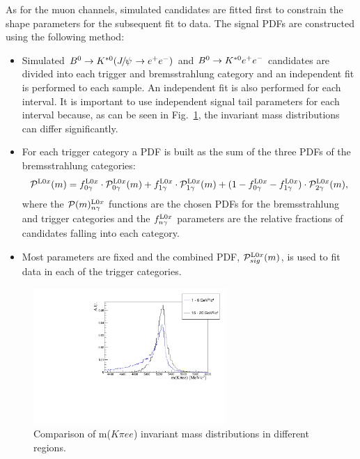 As for the muon channels, simulated candidates are fitted first to constrain
the shape parameters for the subsequent fit to data. The signal PDFs are constructed using the following method:
%
\begin{itemize}
\item Simulated $\Bz\to\Kstarz(\jpsi\to \ee)$ and ${{B}^0}\rightarrow{\ensuremath{{K}^{*0}}} e^+ e^-$ candidates are divided
into each trigger and bremsstrahlung category and an independent fit is performed to each sample.
An independent fit is also performed for each \qsq interval. It is important to use independent signal tail parameters 
for each \qsq interval because, as can be seen in Fig.~\ref{fig:high_central_mass_comparison}, the invariant mass
distributions can differ significantly.
\vspace{2cm}
\item For each trigger category a PDF is built as the sum of the three PDFs of the bremsstrahlung categories:
\begin{equation}
\mathcal{P}^{{\rm L0}x}(m) = f^{{\rm L0}x}_{0\gamma} \cdot \mathcal{P}^{{\rm L0}x}_{0\gamma}(m) + f^{{\rm L0}x}_{1\gamma} \cdot \mathcal{P}^{{\rm L0}x}_{1\gamma}(m) + (1 - f^{{\rm L0}x}_{0\gamma} - f^{{\rm L0}x}_{1\gamma}) \cdot  \mathcal{P}^{{\rm L0}x}_{2\gamma}(m),
\end{equation}
where the $\mathcal{P}(m)^{{\rm L0}x}_{n\gamma}$ functions are the chosen PDFs for the bremsstrahlung and trigger categories
and the $f^{{\rm L0}x}_{n\gamma}$ parameters are the relative fractions of candidates falling into each category.
\item Most parameters are fixed and the combined PDF, $\mathcal{P}^{{\rm L0}x}_{sig}(m)$,
is used to fit data in each of the trigger categories.
\end{itemize}
%
\begin{figure}[h!]
\centering
\includegraphics[width=0.65\textwidth]{RKst/figs/high_central_mass_comparison.pdf}
\caption{Comparison of m($K\pi ee$) invariant mass distributions in different \qsq regions.}
\label{fig:high_central_mass_comparison}
\end{figure}

